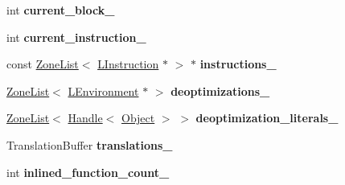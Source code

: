 \begin{DoxyCompactItemize}
\item 
int {\bfseries current\+\_\+block\+\_\+}\hypertarget{classv8_1_1internal_1_1_b_a_s_e___e_m_b_e_d_d_e_d_a88d5e0bc0a03c912b1e62b8a2cfd696e}{}\label{classv8_1_1internal_1_1_b_a_s_e___e_m_b_e_d_d_e_d_a88d5e0bc0a03c912b1e62b8a2cfd696e}

\item 
int {\bfseries current\+\_\+instruction\+\_\+}\hypertarget{classv8_1_1internal_1_1_b_a_s_e___e_m_b_e_d_d_e_d_a32358bf5fb5294e032554fb8d0c1f2dc}{}\label{classv8_1_1internal_1_1_b_a_s_e___e_m_b_e_d_d_e_d_a32358bf5fb5294e032554fb8d0c1f2dc}

\item 
const \hyperlink{classv8_1_1internal_1_1_zone_list}{Zone\+List}$<$ \hyperlink{classv8_1_1internal_1_1_l_instruction}{L\+Instruction} $\ast$ $>$ $\ast$ {\bfseries instructions\+\_\+}\hypertarget{classv8_1_1internal_1_1_b_a_s_e___e_m_b_e_d_d_e_d_af9e5f789c864b5871d7ccd60a6aa22bf}{}\label{classv8_1_1internal_1_1_b_a_s_e___e_m_b_e_d_d_e_d_af9e5f789c864b5871d7ccd60a6aa22bf}

\item 
\hyperlink{classv8_1_1internal_1_1_zone_list}{Zone\+List}$<$ \hyperlink{classv8_1_1internal_1_1_l_environment}{L\+Environment} $\ast$ $>$ {\bfseries deoptimizations\+\_\+}\hypertarget{classv8_1_1internal_1_1_b_a_s_e___e_m_b_e_d_d_e_d_a73c3349c165a85825e3116c3b112f656}{}\label{classv8_1_1internal_1_1_b_a_s_e___e_m_b_e_d_d_e_d_a73c3349c165a85825e3116c3b112f656}

\item 
\hyperlink{classv8_1_1internal_1_1_zone_list}{Zone\+List}$<$ \hyperlink{classv8_1_1internal_1_1_handle}{Handle}$<$ \hyperlink{classv8_1_1internal_1_1_object}{Object} $>$ $>$ {\bfseries deoptimization\+\_\+literals\+\_\+}\hypertarget{classv8_1_1internal_1_1_b_a_s_e___e_m_b_e_d_d_e_d_afb782e810808b65171cd90b0e24ac7a4}{}\label{classv8_1_1internal_1_1_b_a_s_e___e_m_b_e_d_d_e_d_afb782e810808b65171cd90b0e24ac7a4}

\item 
Translation\+Buffer {\bfseries translations\+\_\+}\hypertarget{classv8_1_1internal_1_1_b_a_s_e___e_m_b_e_d_d_e_d_a55a90885c5151c788e484ec21ba50271}{}\label{classv8_1_1internal_1_1_b_a_s_e___e_m_b_e_d_d_e_d_a55a90885c5151c788e484ec21ba50271}

\item 
int {\bfseries inlined\+\_\+function\+\_\+count\+\_\+}\hypertarget{classv8_1_1internal_1_1_b_a_s_e___e_m_b_e_d_d_e_d_a1206dd483c1f76f417911d1175c0213e}{}\label{classv8_1_1internal_1_1_b_a_s_e___e_m_b_e_d_d_e_d_a1206dd483c1f76f417911d1175c0213e}


\end{DoxyCompactItemize}
